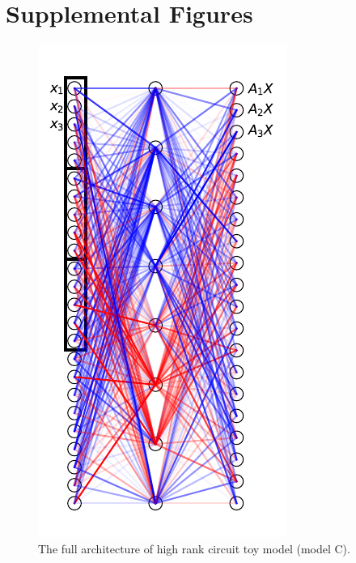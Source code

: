 \documentclass{article}
\theoremstyle{plain}
\theoremstyle{definition}
\theoremstyle{remark}
\begin{document}
\section{Supplemental Figures}


\begin{figure}[ht]
    \centerline{\includegraphics{../figures/s1_high_rank_circuit_setup.pdf}}
    \centering
    \caption{The full architecture of high rank circuit toy model (model C).}\label{fig:s1_high_rank_circuit_setup}
\end{figure}
\end{document}
